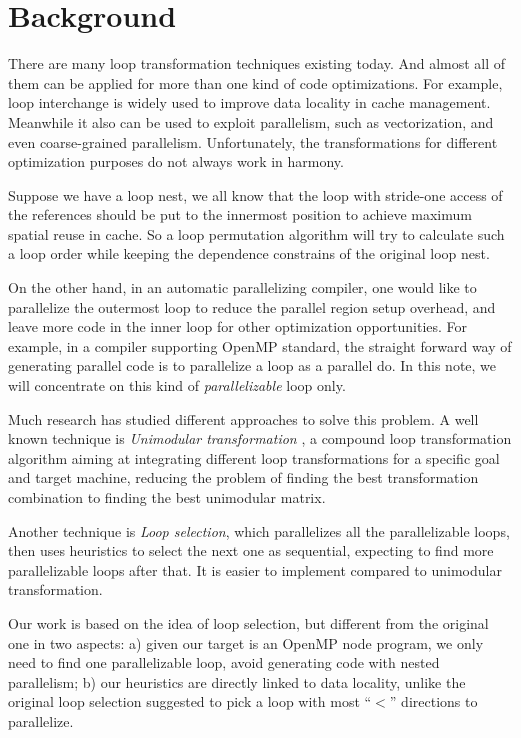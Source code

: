 \section{Background}

There are many loop transformation techniques existing
today\cite{All02}. And almost all of them can be applied for more than
one kind of code optimizations. For example, loop interchange is
widely used to improve data locality in cache management. Meanwhile it
also can be used to exploit parallelism, such as vectorization, and
even coarse-grained parallelism.  Unfortunately, the transformations
for different optimization purposes do not always work in harmony.

Suppose we have a loop nest, we all know that the loop with stride-one
access of the references should be put to the innermost position to
achieve maximum spatial reuse in cache. So a loop permutation
algorithm will try to calculate such a loop order while keeping the
dependence constrains of the original loop nest.

On the other hand, in an automatic parallelizing compiler, one would
like to parallelize the outermost loop to reduce the parallel region
setup overhead, and leave more code in the inner loop for other
optimization opportunities. For example, in a compiler supporting
OpenMP \cite{Cha01} standard, the straight forward way of generating
parallel code is to parallelize a loop as a parallel do. In this note,
we will concentrate on this kind of \emph{parallelizable} loop only.

Much research has studied different approaches to solve this problem.
A well known technique is \emph{Unimodular transformation}
\cite{Mic91}, a compound loop transformation algorithm aiming at
integrating different loop transformations for a specific goal and
target machine, reducing the problem of finding the best
transformation combination to finding the best unimodular matrix.

Another technique is \emph{Loop selection}\cite{All02}, which
parallelizes all the parallelizable loops, then uses heuristics to
select the next one as sequential, expecting to find more
parallelizable loops after that. It is easier to implement compared to
unimodular transformation.

Our work is based on the idea of loop selection, but different from
the original one in two aspects: a) given our target is an OpenMP node
program, we only need to find one parallelizable loop, avoid
generating code with nested parallelism; b) our heuristics are
directly linked to data locality, unlike the original loop selection
suggested to pick a loop with most ``$<$'' directions to parallelize.




